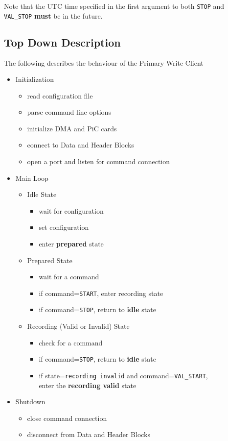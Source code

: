 Note that the UTC time specified in the first argument to both {\tt STOP}
and {\tt VAL\_STOP} {\bf must} be in the future.

\subsection{Top Down Description}

The following describes the behaviour of the Primary Write Client

\begin{itemize}
\item Initialization
	\begin{itemize}
	\item read configuration file
	\item parse command line options
	\item initialize DMA and PiC cards
	\item connect to Data and Header Blocks
	\item open a port and listen for command connection
	\end{itemize}
\item Main Loop
	\begin{itemize}
	\item Idle State
		\begin{itemize}
		\item wait for configuration
		\item set configuration
		\item enter {\bf prepared} state
		\end{itemize}
	\item Prepared State
		\begin{itemize}
		\item wait for a command
		\item if command={\tt *START}, enter recording state
		\item if command={\tt STOP}, return to {\bf idle} state
		\end{itemize}
	\item Recording (Valid or Invalid) State
		\begin{itemize}
		\item check for a command
		\item if command={\tt STOP}, return to {\bf idle} state
		\item if state={\tt recording invalid} and command={\tt VAL\_START}, \\ enter the {\bf recording valid} state
		\end{itemize}
	\end{itemize}
\item Shutdown
	\begin{itemize}
	\item close command connection
	\item disconnect from Data and Header Blocks
	\end{itemize}
\end{itemize}



